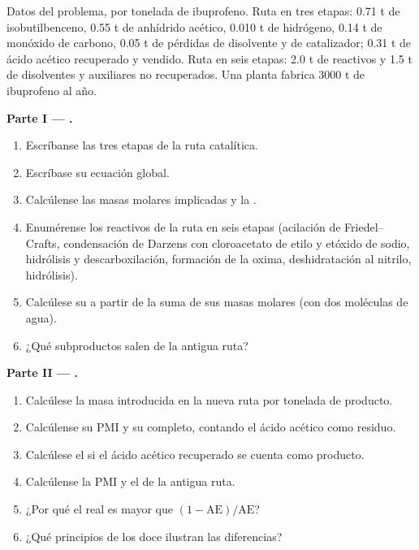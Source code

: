 \begin{problem}
\label{pb:b3:green-industrial:1}
Datos del problema, por tonelada de ibuprofeno. Ruta en tres etapas: 0.71 t de
isobutilbenceno, 0.55 t de anhídrido acético, 0.010 t de hidrógeno, 0.14 t de monóxido de
carbono, 0.05 t de pérdidas de disolvente y de catalizador; 0.31 t de ácido acético recuperado
y vendido. Ruta en seis etapas: 2.0 t de reactivos y 1.5 t de disolventes y auxiliares
no recuperados. Una planta fabrica 3000 t de ibuprofeno al año.

\medskip\noindent\textbf{Parte I --- .}
\begin{enumerate}
  \item Escríbanse las tres etapas de la ruta catalítica.
  \item Escríbase su ecuación global.
  \item Calcúlense las masas molares implicadas y la .
  \item Enumérense los reactivos de la ruta en seis etapas (acilación de Friedel--Crafts, condensación
        de Darzens con cloroacetato de etilo y etóxido de sodio, hidrólisis y
        descarboxilación, formación de la oxima, deshidratación al nitrilo, hidrólisis).
  \item Calcúlese su  a partir de la suma de sus masas molares (con dos
        moléculas de agua).
  \item ¿Qué subproductos salen de la antigua ruta?
\end{enumerate}

\medskip\noindent\textbf{Parte II --- .}
\begin{enumerate}[resume]
  \item Calcúlese la masa introducida en la nueva ruta por tonelada de producto.
  \item Calcúlense su PMI y su  completo, contando el ácido acético como residuo.
  \item Calcúlese el  si el ácido acético recuperado se cuenta como producto.
  \item Calcúlense la PMI y el  de la antigua ruta.
  \item ¿Por qué el  real es mayor que $(1 - \mathrm{AE})/\mathrm{AE}$?
  \item ¿Qué principios de los doce ilustran las diferencias?
\end{enumerate}


\end{problem}
